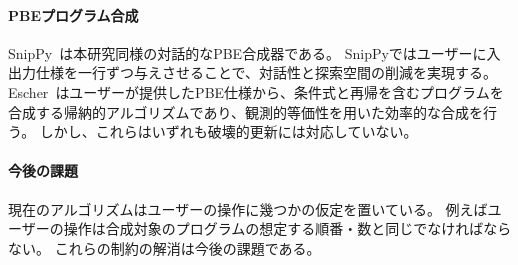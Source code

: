 \documentclass[11pt, a4paper, oneside, twocolumn]{jsarticle}
\begin{document}
\paragraph*{PBEプログラム合成}
\textsf{SnipPy}~\cite{smallstep}は本研究同様の対話的なPBE合成器である。
\textsf{SnipPy}ではユーザーに入出力仕様を一行ずつ与えさせることで、対話性と探索空間の削減を実現する。
%
%
\textsf{Escher}~\cite{escher}はユーザーが提供したPBE仕様から、条件式と再帰を含むプログラムを合成する帰納的アルゴリズムであり、観測的等価性を用いた効率的な合成を行う。
しかし、これらはいずれも破壊的更新には対応していない。


\paragraph*{今後の課題}

現在のアルゴリズムはユーザーの操作に幾つかの仮定を置いている。
例えばユーザーの操作は合成対象のプログラムの想定する順番・数と同じでなければならない。
これらの制約の解消は今後の課題である。
\end{document}
